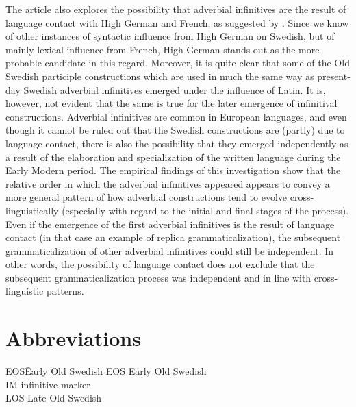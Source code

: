 \documentclass[output=paper]{langscibook}
\begin{document}
The article also explores the possibility that adverbial infinitives are the result of language contact with High German and French, as suggested by \citet{Holm1967}. Since we know of other instances of syntactic influence from High German on Swedish, but of mainly lexical influence from French, High German stands out as the more probable candidate in this regard. Moreover, it is quite clear that some of the Old Swedish participle constructions which are used in much the same way as present-day Swedish adverbial infinitives emerged under the influence of Latin. It is, however, not evident that the same is true for the later emergence of infinitival constructions. Adverbial infinitives are common in European languages, and even though it cannot be ruled out that the Swedish constructions are (partly) due to language contact, there is also the possibility that they emerged independently as a result of the elaboration and specialization of the written language during the Early Modern period. The empirical findings of this investigation show that the relative order in which the adverbial infinitives appeared appears to convey a more general pattern of how adverbial constructions tend to evolve cross-linguistically (especially with regard to the initial and final stages of the process). Even if the emergence of the first adverbial infinitives is the result of language contact (in that case an example of replica grammaticalization), the subsequent grammaticalization of other adverbial infinitives could still be independent. In other words, the possibility of language contact does not exclude that the subsequent grammaticalization process was independent and in line with cross-linguistic patterns. 


\section*{Abbreviations}
\begin{tabbing}
EOS\hspace{1ex}\= Early Old Swedish\kill
EOS \> Early Old Swedish\\
IM  \> infinitive marker\\
LOS \> Late Old Swedish\\
\end{tabbing}
\end{document}

